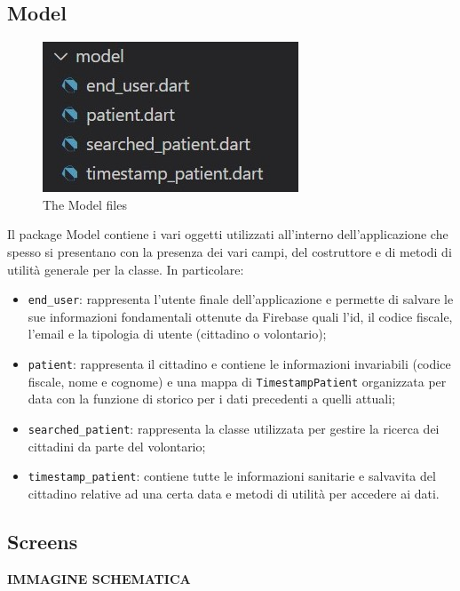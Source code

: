 \documentclass[12pt,a4paper,twoside,openright,titlepage]{book}
\begin{document}
\subsection{Model}
\begin{figure}[H]
\centering
\includegraphics[scale = 1.0]{model}
\caption{The Model files}
\end{figure}
Il package Model contiene i vari oggetti utilizzati all'interno dell'applicazione che spesso si presentano con la presenza dei vari campi, del costruttore e di metodi di utilità generale per la classe. In particolare:
\begin{itemize}
\item \texttt{end\_user}: rappresenta l'utente finale dell'applicazione e permette di salvare le sue informazioni fondamentali ottenute da Firebase quali l'id, il codice fiscale, l'email e la tipologia di utente (cittadino o volontario);
\item \texttt{patient}: rappresenta il cittadino e contiene le informazioni invariabili (codice fiscale, nome e cognome) e una mappa di \texttt{TimestampPatient} organizzata per data con la funzione di storico per i dati precedenti a quelli attuali;
\item \texttt{searched\_patient}: rappresenta la classe utilizzata per gestire la ricerca dei cittadini da parte del volontario;
\item \texttt{timestamp\_patient}: contiene tutte le informazioni sanitarie e salvavita del cittadino relative ad una certa data e metodi di utilità per accedere ai dati.
\end{itemize}

\subsection{Screens}
\textbf{IMMAGINE SCHEMATICA}\newline
\end{document}
